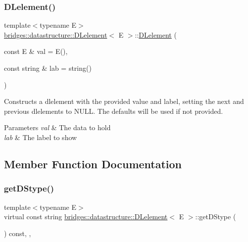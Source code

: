 \subsubsection{\texorpdfstring{D\+Lelement()}{DLelement()}\hspace{0.1cm}{\footnotesize\ttfamily [2/2]}}
{\footnotesize\ttfamily template$<$typename E$>$ \\
\hyperlink{classbridges_1_1datastructure_1_1_d_lelement}{bridges\+::datastructure\+::\+D\+Lelement}$<$ E $>$\+::\hyperlink{classbridges_1_1datastructure_1_1_d_lelement}{D\+Lelement} (\begin{DoxyParamCaption}\item[{const E \&}]{val = {\ttfamily E()},  }\item[{const string \&}]{lab = {\ttfamily string()} }\end{DoxyParamCaption})\hspace{0.3cm}{\ttfamily [inline]}}

Constructs a dlelement with the provided value and label, setting the next and previous dlelements to N\+U\+LL. The defaults will be used if not provided.


\begin{DoxyParams}{Parameters}
{\em val} & The data to hold \\
\hline
{\em lab} & The label to show \\
\hline
\end{DoxyParams}


\subsection{Member Function Documentation}
\mbox{\label{classbridges_1_1datastructure_1_1_d_lelement_a736ba8e6901608fb0ab04d781d2cceee}} 
\subsubsection{\texorpdfstring{get\+D\+Stype()}{getDStype()}}
{\footnotesize\ttfamily template$<$typename E$>$ \\
virtual const string \hyperlink{classbridges_1_1datastructure_1_1_d_lelement}{bridges\+::datastructure\+::\+D\+Lelement}$<$ E $>$\+::get\+D\+Stype (\begin{DoxyParamCaption}{ }\end{DoxyParamCaption}) const\hspace{0.3cm}{\ttfamily [inline]}, {\ttfamily [override]}, {\ttfamily [virtual]}}

